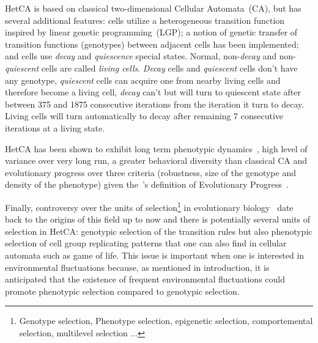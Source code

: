 HetCA is based on classical two-dimensional Cellular Automata~(CA), but has several additional features: cells utilize a heterogeneous transition function inspired by linear genetic programming~(LGP); a notion of genetic transfer of transition functions (genotypes) between adjacent cells has been implemented; and cells use \emph{decay} and \emph{quiescence} special states. Normal, non-\emph{decay} and non-\emph{quiescent} cells are called \emph{living cells}. \emph{Decay} cells and \emph{quiescent} cells don't have any genotype, \emph{quiescent} cells can acquire one from nearby living cells and therefore become a living cell, \emph{decay} can't but will turn to quiescent state after between 375 and 1875 consecutive iterations from the iteration it turn to decay. Living cells will turn automatically to decay after remaining 7 consecutive iterations at a living state. 

HetCA has been shown to exhibit long term phenotypic dynamics~\citep{medernach2013long}, high level of variance over very long run, a greater behavioral diversity than classical CA and evolutionary progress over three criteria (robustness, size of the genotype and density of the phenotype) given the~\cite{shanahan2012evolutionary}'s definition of Evolutionary Progress~\citep{medernach2015evolutionary}.



Finally, controversy over the units of selection\footnote{Genotype selection, Phenotype selection, epigenetic selection, comportemental selection, multilevel selection \cite{lloyd2012unitsandlevelsofselection}...} in evolutionary biology~\citep{okasha2006evolution} date back to the origins of this field up to now and there is potentially several units of selection in HetCA: genotypic selection of the transition rules but also phenotypic selection of cell group replicating patterns that one can also find in cellular automata such as game of life.  This issue is important when one is interested in environmental fluctuations because, as mentioned in introduction, it is anticipated that the existence of frequent environmental fluctuations could promote phenotypic selection compared to genotypic selection.



